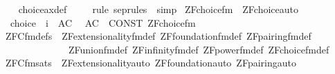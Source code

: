 \begin{isabellebody}
%
\isadelimproof
\ \ %
\endisadelimproof
%
\isatagproof
{}\isamarkupfalse%
\ choice{\isacharunderscore}{\kern0pt}ax{\isacharunderscore}{\kern0pt}def\ \isanewline
\ \ \isamarkupfalse%
\ {\isacharparenleft}{\kern0pt}{\isacharparenleft}{\kern0pt}rule\ sep{\isacharunderscore}{\kern0pt}rules\ {\isacharbar}{\kern0pt}\ simp{\isacharparenright}{\kern0pt}{\isacharplus}{\kern0pt}{\isacharparenright}{\kern0pt}%
\endisatagproof
{\isafoldproof}%
%
\isadelimproof
\isanewline
%
\endisadelimproof
%
\isadelimML
\isanewline
%
\endisadelimML
%
\isatagML
{}\isamarkupfalse%
\ {\isachardoublequoteopen}ZF{\isacharunderscore}{\kern0pt}choice{\isacharunderscore}{\kern0pt}fm{\isachardoublequoteclose}\ \ ZF{\isacharunderscore}{\kern0pt}choice{\isacharunderscore}{\kern0pt}auto%
\endisatagML
{\isafoldML}%
%
\isadelimML
\isanewline
%
\endisadelimML
\isanewline
{}\isamarkupfalse%
\isanewline
\ \ {\isachardoublequoteopen}{\isacharunderscore}{\kern0pt}choice{\isachardoublequoteclose}\ {\isacharcolon}{\kern0pt}{\isacharcolon}{\kern0pt}\ {\isachardoublequoteopen}i{\isachardoublequoteclose}\ \ {\isacharparenleft}{\kern0pt}{\isachardoublequoteopen}AC{\isachardoublequoteclose}{\isacharparenright}{\kern0pt}\isanewline
{}\isamarkupfalse%
\isanewline
\ \ {\isachardoublequoteopen}AC{\isachardoublequoteclose}\ {\isasymrightharpoonup}\ {\isachardoublequoteopen}CONST\ ZF{\isacharunderscore}{\kern0pt}choice{\isacharunderscore}{\kern0pt}fm{\isachardoublequoteclose}\isanewline
\isanewline
{}\isamarkupfalse%
\ ZFC{\isacharunderscore}{\kern0pt}fm{\isacharunderscore}{\kern0pt}defs\ {\isacharequal}{\kern0pt}\ ZF{\isacharunderscore}{\kern0pt}extensionality{\isacharunderscore}{\kern0pt}fm{\isacharunderscore}{\kern0pt}def\ ZF{\isacharunderscore}{\kern0pt}foundation{\isacharunderscore}{\kern0pt}fm{\isacharunderscore}{\kern0pt}def\ ZF{\isacharunderscore}{\kern0pt}pairing{\isacharunderscore}{\kern0pt}fm{\isacharunderscore}{\kern0pt}def\isanewline
\ \ \ \ \ \ \ \ \ \ \ \ \ \ ZF{\isacharunderscore}{\kern0pt}union{\isacharunderscore}{\kern0pt}fm{\isacharunderscore}{\kern0pt}def\ ZF{\isacharunderscore}{\kern0pt}infinity{\isacharunderscore}{\kern0pt}fm{\isacharunderscore}{\kern0pt}def\ ZF{\isacharunderscore}{\kern0pt}power{\isacharunderscore}{\kern0pt}fm{\isacharunderscore}{\kern0pt}def\ ZF{\isacharunderscore}{\kern0pt}choice{\isacharunderscore}{\kern0pt}fm{\isacharunderscore}{\kern0pt}def\isanewline
\isanewline
{}\isamarkupfalse%
\ ZFC{\isacharunderscore}{\kern0pt}fm{\isacharunderscore}{\kern0pt}sats\ {\isacharequal}{\kern0pt}\ ZF{\isacharunderscore}{\kern0pt}extensionality{\isacharunderscore}{\kern0pt}auto\ ZF{\isacharunderscore}{\kern0pt}foundation{\isacharunderscore}{\kern0pt}auto\ ZF{\isacharunderscore}{\kern0pt}pairing{\isacharunderscore}{\kern0pt}auto\isanewline

\end{isabellebody}
